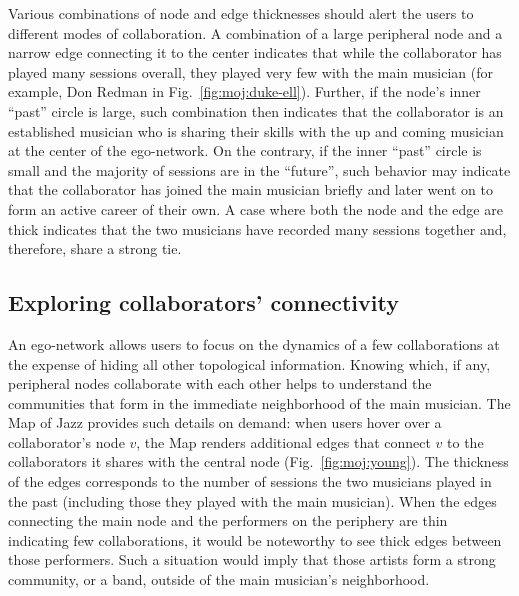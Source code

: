 \documentclass[12pt]{cmuthesis}
\begin{document}
  Various combinations of node and edge thicknesses should alert the users to different modes of collaboration. A combination of a large peripheral node and a narrow edge connecting it to the center indicates that while the collaborator has played many sessions overall, they played very few with the main musician (for example, Don Redman in Fig.~\ref{fig:moj:duke-ell}). Further, if the node's inner ``past'' circle is large, such combination then indicates that the collaborator is an established musician who is sharing their skills with the up and coming musician at the center of the ego-network. On the contrary, if the inner ``past'' circle is small and the majority of sessions are in the ``future'', such behavior may indicate that the collaborator has joined the main musician briefly and later went on to form an active career of their own. A case where both the node and the edge are thick indicates that the two musicians have recorded many sessions together and, therefore, share a strong tie.


  \subsection{Exploring collaborators' connectivity}

  An ego-network allows users to focus on the dynamics of a few collaborations at the expense of hiding all other topological information. Knowing which, if any, peripheral nodes collaborate with each other helps to understand the communities that form in the immediate neighborhood of the main musician. The Map of Jazz provides such details on demand: when users hover over a collaborator's node $v$, the Map renders additional edges that connect $v$ to the collaborators it shares with the central node (Fig.~\ref{fig:moj:young}). The thickness of the edges corresponds to the number of sessions the two musicians played in the past (including those they played with the main musician). When the edges connecting the main node and the performers on the periphery are thin indicating few collaborations, it would be noteworthy to see thick edges between those performers. Such a situation would imply that those artists form a strong community, or a band, outside of the main musician's neighborhood.

\end{document}
